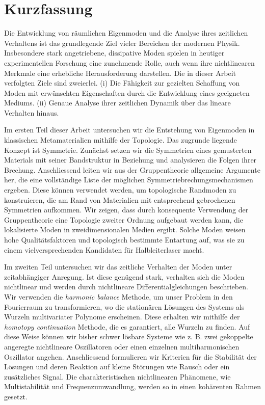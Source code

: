 
\chapter*{Kurzfassung}

Die Entwicklung von räumlichen Eigenmoden und die Analyse ihres zeitlichen Verhaltens ist das grundlegende Ziel vieler Bereichen der modernen Physik. Insbesondere stark angetriebene, dissipative Moden spielen in heutiger experimentellen Forschung eine zunehmende Rolle, auch wenn ihre nichtlinearen Merkmale eine erhebliche Herausforderung darstellen. Die in dieser Arbeit verfolgten Ziele sind zweierlei. (i) Die Fähigkeit zur gezielten Schaffung von Moden mit erwünschten Eigenschaften durch die Entwicklung eines geeigneten Mediums. (ii) Genaue Analyse ihrer zeitlichen Dynamik über das lineare Verhalten hinaus. 

Im ersten Teil dieser Arbeit untersuchen wir die Entstehung von Eigenmoden in klassischen Metamaterialien mithilfe der Topologie. Das zugrunde liegende Konzept ist Symmetrie. Zunächst setzen wir die Symmetrien eines gemusterten Materials mit seiner Bandstruktur in Beziehung und analysieren die Folgen ihrer Brechung. Anschliessend leiten wir aus der Gruppentheorie allgemeine Argumente her, die eine vollständige Liste der möglichen Symmetriebrechungsmechanismen ergeben. Diese können verwendet werden, um topologische Randmoden zu konstruieren, die am Rand von Materialien mit entsprechend gebrochenen Symmetrien aufkommen. Wir zeigen, dass durch konsequente Verwendung der Gruppentheorie eine Topologie zweiter Ordnung aufgebaut werden kann, die lokalisierte Moden in zweidimensionalen Medien ergibt. Solche Moden weisen hohe Qualitätsfaktoren und topologisch bestimmte Entartung auf, was sie zu einem vielversprechenden Kandidaten für Halbleiterlaser macht.

Im zweiten Teil untersuchen wir das zeitliche Verhalten der Moden unter zeitabhängiger Anregung. Ist diese genügend stark, verhalten sich die Moden nichtlinear und werden durch nichtlineare Differentialgleichungen beschrieben. Wir verwenden die \textit{harmonic balance} Methode, um unser Problem in den Fourierraum zu transformieren, wo die stationären Lösungen des Systems als Wurzeln multivariater Polynome erscheinen. Diese erhalten wir mithilfe der \textit{homotopy continuation} Methode, die es garantiert, alle Wurzeln zu finden. Auf diese Weise können wir bisher schwer lösbare Systeme wie z. B. zwei gekoppelte angeregte nichtlineare Oszillatoren oder einen einzelnen multiharmonischen Oszillator angehen. Anschliessend formulieren wir Kriterien für die Stabilität der Lösungen und deren Reaktion auf kleine Störungen wie Rausch oder ein zusätzliches Signal. Die charakteristischen nichtlinearen Phänomene, wie Multistabilität und Frequenzumwandlung, werden so in einen kohärenten Rahmen gesetzt.


